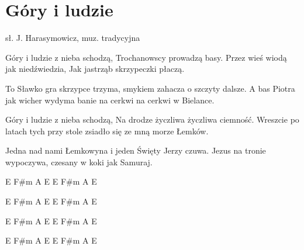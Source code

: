 \section{Góry i ludzie}{sł. J. Harasymowicz, muz. tradycyjna}
\begin{text}
Góry i ludzie z nieba schodzą,
Trochanowscy prowadzą basy.
Przez wieś wiodą jak niedźwiedzia,
Jak jastrząb skrzypeczki płaczą.

To Sławko gra skrzypce trzyma,
smykiem zahacza o szczyty dalsze.
A bas Piotra jak wicher wydyma
banie na cerkwi na cerkwi w Bielance.

Góry i ludzie z nieba schodzą,
Na drodze życzliwa życzliwa ciemność.
Wreszcie po latach tych przy stole
zsiadło się ze mną morze Łemków.

Jedna nad nami Łemkowyna
i jeden Święty Jerzy czuwa.
Jezus na tronie wypoczywa,
czesany w koki jak Samuraj.
\end{text}
\begin{chord}
E F#m
A E
E F#m
A E

E F#m
A E
E F#m
A E

E F#m
A E
E F#m
A E

E F#m
A E
E F#m
A E
\end{chord}